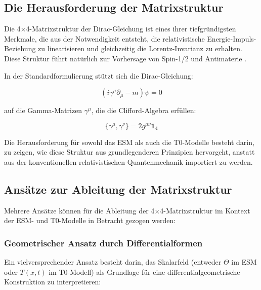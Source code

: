 \documentclass[12pt,a4paper]{article}
\newcommand{\Tfieldt}{T(x,t)}
\begin{document}
	\subsection{Die Herausforderung der Matrixstruktur}
	\label{subsec:matrix_challenge}
	
	Die 4$\times$4-Matrixstruktur der Dirac-Gleichung ist eines ihrer tiefgründigsten Merkmale, die aus der Notwendigkeit entsteht, die relativistische Energie-Impuls-Beziehung zu linearisieren und gleichzeitig die Lorentz-Invarianz zu erhalten. Diese Struktur führt natürlich zur Vorhersage von Spin-1/2 und Antimaterie \cite{dirac1928}.
	
	In der Standardformulierung stützt sich die Dirac-Gleichung:
	
	\begin{equation}
		(i\gamma^{\mu}\partial_{\mu} - m)\psi = 0
		\label{eq:standard_dirac}
	\end{equation}
	
	auf die Gamma-Matrizen $\gamma^{\mu}$, die die Clifford-Algebra erfüllen:
	
	\begin{equation}
		\{\gamma^{\mu}, \gamma^{\nu}\} = 2g^{\mu\nu}\mathbf{1}_4
		\label{eq:clifford_algebra}
	\end{equation}
	
	Die Herausforderung für sowohl das ESM als auch die T0-Modelle besteht darin, zu zeigen, wie diese Struktur aus grundlegenderen Prinzipien hervorgeht, anstatt aus der konventionellen relativistischen Quantenmechanik importiert zu werden.
	
	\subsection{Ansätze zur Ableitung der Matrixstruktur}
	\label{subsec:derivation_approaches}
	
	Mehrere Ansätze können für die Ableitung der 4$\times$4-Matrixstruktur im Kontext der ESM- und T0-Modelle in Betracht gezogen werden:
	
	\subsubsection{Geometrischer Ansatz durch Differentialformen}
	\label{subsubsec:geometric_approach}
	
	Ein vielversprechender Ansatz besteht darin, das Skalarfeld (entweder $\Theta$ im ESM oder $\Tfieldt$ im T0-Modell) als Grundlage für eine differentialgeometrische Konstruktion zu interpretieren:
	
\end{document}
